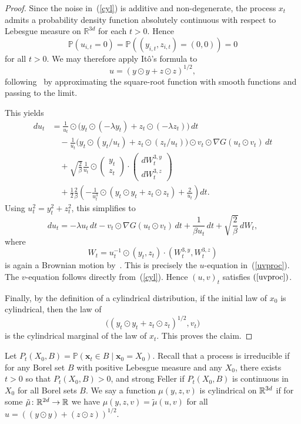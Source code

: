 \documentclass[11pt, twoside]{report}
\renewcommand{\vec}[1]{{\mathbf{#1}}}
\begin{document}
\begin{proof}
Since the noise in~(\ref{cyl}) is additive and non-degenerate, the
process \(x_t\) admits a probability density function absolutely
continuous with respect to Lebesgue measure on \(\mathbb R^{3d}\) for each
\(t>0\). Hence
\[
\mathbb P(u_{i,t}=0)
=
\mathbb P((y_{i,t},z_{i,t})=(0,0))
=
0
\]
for all \(t>0\). We may therefore apply It\^o's formula to
\[
u=(y\odot y+z\odot z)^{1/2},
\]
following~\cite[Proposition~3.21]{Karatzas1991-xr} by approximating the
square-root function with smooth functions and passing to the limit.

This yields
\[
\begin{aligned}
du_t
&=
\frac{1}{u_t}\odot
\Big(
y_t\odot(-\lambda y_t)
+
z_t\odot(-\lambda z_t)
\Big)\,dt \\
&\quad
-\frac{1}{u_t}
\Big(
y_t\odot(y_t/u_t)
+
z_t\odot(z_t/u_t)
\Big)
\odot v_t\odot\nabla G(u_t\odot v_t)\,dt \\
&\quad
+
\sqrt{\frac{2}{\beta}}
\frac{1}{u_t}
\odot
\begin{pmatrix}
y_t\\
z_t
\end{pmatrix}
\cdot
\begin{pmatrix}
dW_t^{3,y}\\
dW_t^{3,z}
\end{pmatrix} \\
&\quad
+
\frac12\frac{2}{\beta}
\left(
-\frac{1}{u_t^3}
\odot
(y_t\odot y_t+z_t\odot z_t)
+
\frac{2}{u_t}
\right)dt .
\end{aligned}
\]
Using \(u_t^2=y_t^2+z_t^2\), this simplifies to
\[
du_t
=
-\lambda u_t\,dt
-
v_t\odot\nabla G(u_t\odot v_t)\,dt
+
\frac{1}{\beta u_t}\,dt
+
\sqrt{\frac{2}{\beta}}\,dW_t,
\]
where
\[
W_t
=
u_t^{-1}\odot (y_t,z_t)\cdot (W_t^{3,y},W_t^{3,z})
\]
is again a Brownian motion by~\cite[Theorem~3.3.16]{Karatzas1991-xr}.
This is precisely the \(u\)-equation in~(\ref{uvproc}). The \(v\)-equation
follows directly from~(\ref{cyl}). Hence \((u,v)_t\) satisfies
\((\ref{uvproc})\).

Finally, by the definition of a cylindrical distribution, if the initial
law of \(x_0\) is cylindrical, then the law of
\[
\big((y_t\odot y_t+z_t\odot z_t)^{1/2},v_t\big)
\]
is the cylindrical marginal of the law of \(x_t\). This proves the claim.
\end{proof}






Let $P_t(X_0,B)=\mathbb{P}(\vec x_t\in B\mid \vec x_0=X_0)$.
Recall that a process is irreducible if for any Borel set $B$ with positive Lebesgue measure and any $X_0$, there exists $t>0$ so that $P_t(X_0,B)>0$, and strong Feller if $P_t(X_0,B)
$ is continuous in $X_0$ for all Borel sets $B$.
We say a function $\mu(y,z,v)$ is cylindrical on $\mathbb{R}^{3d}$ if for some $\tilde \mu\colon \mathbb{R}^{2d}\to \mathbb{R}$ we have $\mu(y,z,v)=\tilde \mu(u,v)$  for all $u=((y\odot y)+(z\odot z))^{1/2}$.
\end{document}
